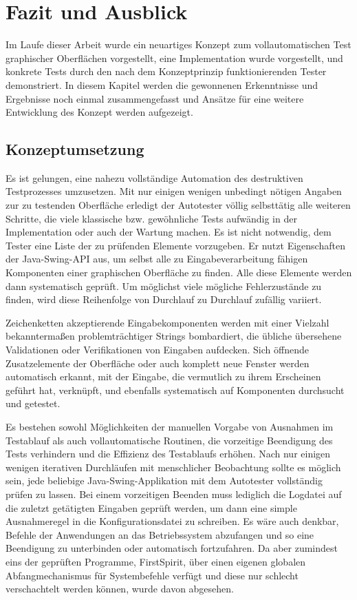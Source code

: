 \chapter{Fazit und Ausblick}\label{chapter:expansion}

Im Laufe dieser Arbeit wurde ein neuartiges Konzept zum vollautomatischen
Test graphischer Oberflächen vorgestellt, eine Implementation wurde
vorgestellt, und konkrete Tests durch den nach dem Konzeptprinzip
funktionierenden Tester demonstriert. In diesem Kapitel werden
die gewonnenen Erkenntnisse und Ergebnisse noch einmal zusammengefasst 
und Ansätze für eine weitere Entwicklung des Konzept werden aufgezeigt.


\section{Konzeptumsetzung}\label{section:conceptimplement}

Es ist gelungen, eine nahezu vollständige Automation des destruktiven
Testprozesses umzusetzen. Mit nur einigen wenigen unbedingt nötigen Angaben
zur zu testenden Oberfläche erledigt der Autotester völlig selbsttätig
alle weiteren Schritte, die viele klassische bzw. gewöhnliche Tests aufwändig
in der Implementation oder auch der Wartung machen. Es ist nicht notwendig,
dem Tester eine Liste der zu prüfenden Elemente vorzugeben. Er nutzt
Eigenschaften der Java-Swing-API aus, um selbst alle zu Eingabeverarbeitung
fähigen Komponenten einer graphischen Oberfläche zu finden. Alle diese
Elemente werden dann systematisch geprüft. Um möglichst viele
mögliche Fehlerzustände zu finden, wird diese Reihenfolge von Durchlauf
zu Durchlauf zufällig variiert.

Zeichenketten akzeptierende Eingabekomponenten werden mit einer
Vielzahl bekanntermaßen problemträchtiger Strings bombardiert,
die übliche übersehene Validationen oder Verifikationen von
Eingaben aufdecken. Sich öffnende Zusatzelemente der Oberfläche
oder auch komplett neue Fenster werden automatisch erkannt, mit
der Eingabe, die vermutlich zu ihrem Erscheinen geführt hat, verknüpft,
und ebenfalls systematisch auf Komponenten durchsucht und getestet.

Es bestehen sowohl Möglichkeiten der manuellen Vorgabe von
Ausnahmen im Test\-ablauf als auch vollautomatische Routinen,
die vorzeitige Beendigung des Tests verhindern und die
Effizienz des Testablaufs erhöhen. Nach nur einigen wenigen iterativen
Durchläufen mit menschlicher Beobachtung sollte es möglich sein, 
jede beliebige Java-Swing-Applikation mit dem Autotester vollständig 
prüfen zu lassen. Bei einem vorzeitigen Beenden muss lediglich die
Logdatei auf die zuletzt getätigten Eingaben geprüft werden,
um dann eine simple Ausnahmeregel in die Konfigurationsdatei zu schreiben.
Es wäre auch denkbar, Befehle der Anwendungen an das
Betriebssystem abzufangen und so eine Beendigung zu unterbinden
oder automatisch fortzufahren. Da aber zumindest eins der
geprüften Programme, FirstSpirit, über einen eigenen
globalen Abfangmechanismus für Systembefehle verfügt und diese nur
schlecht verschachtelt werden können, wurde davon abgesehen.


